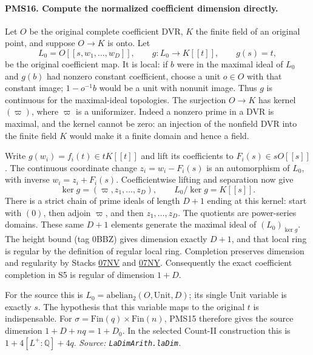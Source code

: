 \paragraph{PMS16. Compute the normalized coefficient dimension directly.}
\label{claim:PMS16}
Let $O$ be the original complete coefficient DVR, $K$ the finite
field of an original point, and suppose $O\to K$ is onto.
Let
\[
 L_0=O[[s,w_1,\ldots,w_D]],\qquad
 g:L_0\longrightarrow K[[t]],\qquad g(s)=t,       \tag{PMS.28}
\]
be the original coefficient map.  It is local: if $b$ were in
the maximal ideal of $L_0$ and $g(b)$ had nonzero constant
coefficient, choose a unit $o\in O$ with that constant image;
$1-o^{-1}b$ would be a unit with nonunit image.  Thus $g$ is
continuous for the maximal-ideal topologies.
The surjection $O\to K$ has kernel $(\varpi)$, where $\varpi$
is a uniformizer.  Indeed a nonzero prime in a DVR is maximal,
and the kernel cannot be zero: an injection of the nonfield
DVR into the finite field $K$ would make it a finite domain and
hence a field.

Write $g(w_i)=f_i(t)\in tK[[t]]$ and lift its coefficients to
$F_i(s)\in sO[[s]]$.
The continuous coordinate change $z_i=w_i-F_i(s)$ is an
automorphism of $L_0$, with inverse $w_i=z_i+F_i(s)$.
Coefficientwise lifting and separation now give
\[
 \ker g=(\varpi,z_1,\ldots,z_D),\qquad
 L_0/\ker g=K[[s]].                              \tag{PMS.29}
\]
There is a strict chain of prime ideals of length $D+1$ ending
at this kernel: start with $(0)$, then adjoin $\varpi$, and
then $z_1,\ldots,z_D$.  The quotients are power-series domains.
These same $D+1$ elements generate the maximal ideal of
$(L_0)_{\ker g}$.  The height bound (tag 0BBZ) gives dimension
exactly $D+1$, and that local ring is regular by the definition
of regular local ring.
Completion preserves dimension and regularity by Stacks
\href{https://stacks.math.columbia.edu/tag/07NV}{07NV} and
\href{https://stacks.math.columbia.edu/tag/07NY}{07NY}.
Consequently the exact coefficient completion in S5 is regular
of dimension $1+D$.

For the source this is $L_0=\mathrm{abelian}_2(O,\mathrm{Unit},D)$;
its single Unit variable is exactly $s$.  The hypothesis that
this variable maps to the original $t$ is indispensable.  For
$\sigma=\mathrm{Fin}(q)\times\mathrm{Fin}(n)$, PMS15 therefore
gives the source dimension
$1+D+nq=1+D_0$.  In the selected Count-II construction this is
$1+4[L^+:\mathbb Q]+4q$.
\hfill\textit{Source: \texttt{LaDimArith.laDim}.}

